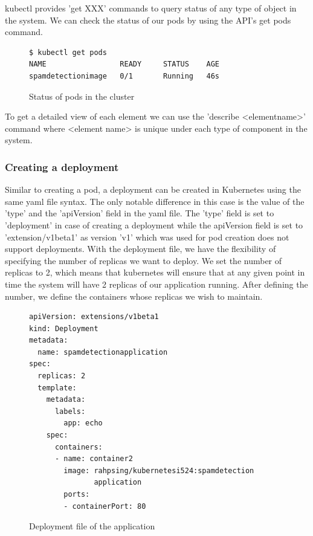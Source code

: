\documentclass[9pt,twocolumn,twoside]{../../styles/osajnl}
\begin{document}
\noindent
kubectl provides 'get XXX' commands to query status of any type of
object in the system. We can check the status of our pods by using the
API's get pods command.

\begin{figure}
\begin{verbatim}
$ kubectl get pods
NAME                 READY     STATUS    AGE
spamdetectionimage   0/1       Running   46s
\end{verbatim}
\caption{Status of pods in the cluster}
\label{Status of pods in the cluster}
\end{figure}
\noindent
To get a detailed view of each element we can use the 'describe
<element\textunderscore name>' command where <element\textunderscore
name> is unique under each type of component in the system.


\subsubsection{Creating a deployment}
Similar to creating a pod, a deployment can be created in Kubernetes
using the same yaml file syntax. The only notable difference in this
case is the value of the 'type' and the 'apiVersion' field in the yaml
file. The 'type' field is set to 'deployment' in case of creating a
deployment while the apiVersion field is set to 'extension/v1beta1' as
version 'v1' which was used for pod creation does not support
deployments.  With the deployment file, we have the flexibility of
specifying the number of replicas we want to deploy. We set the number
of replicas to 2, which means that kubernetes will ensure that at any
given point in time the system will have 2 replicas of our application
running. After defining the number, we define the containers whose
replicas we wish to maintain.

\begin{figure}
\begin{verbatim}
apiVersion: extensions/v1beta1
kind: Deployment
metadata:
  name: spamdetectionapplication
spec:
  replicas: 2
  template:
    metadata:
      labels:
        app: echo
    spec:
      containers:
      - name: container2
        image: rahpsing/kubernetesi524:spamdetection
               application
        ports:
        - containerPort: 80
\end{verbatim}
\caption{Deployment file of the application}
\vspace{-3mm}
\label{Deployment file of the application}
\end{figure}
\end{document}
